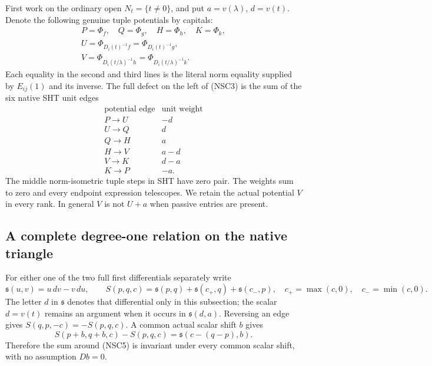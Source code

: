 First work on the ordinary open $N_t=\{t\ne0\}$, and put
$a=v(\lambda)$, $d=v(t)$.  Denote the following genuine tuple
potentials by capitals:
\[
 \begin{gathered}
 P=\Phi_f,\quad Q=\Phi_g,\quad H=\Phi_h,\quad K=\Phi_k,\\
 U=\Phi_{D_i(t)^{-1}f}=\Phi_{D_i(t)^{-1}g},\\
 V=\Phi_{D_i(t/\lambda)^{-1}h}
                     =\Phi_{D_i(t/\lambda)^{-1}k}.
 \end{gathered}
 \tag{NSC4}
\]
Each equality in the second and third lines is the literal
norm equality supplied by $E_{ij}(1)$ and its inverse.
The full defect on the left of (NSC3) is the sum of the
six native SHT unit edges
\[
 \begin{array}{c|c}
 \text{potential edge}&\text{unit weight}\\ \hline
 P\longrightarrow U&-d\\
 U\longrightarrow Q&d\\
 Q\longrightarrow H&a\\
 H\longrightarrow V&a-d\\
 V\longrightarrow K&d-a\\
 K\longrightarrow P&-a .
 \end{array}
 \tag{NSC5}
\]
The middle norm-isometric tuple steps in SHT have zero pair.
The weights sum to zero and every endpoint expression telescopes.
We retain the actual potential $V$ in every rank.  In general
$V$ is not $U+a$ when passive entries are present.

\subsection{A complete degree-one relation on the native triangle}

For either one of the two full first differentials separately
write
\[
  \mathfrak s(u,v)=u\,dv-v\,du,\qquad
  S(p,q,c)=\mathfrak s(p,q)+\mathfrak s(c_+,q)
                                      +\mathfrak s(c_-,p),
  \quad c_+=\max(c,0),\quad c_-=\min(c,0).
 \tag{NSC6}
\]
The letter $d$ in $\mathfrak s$ denotes that differential only
in this subsection; the scalar $d=v(t)$ remains an argument
when it occurs in $\mathfrak s(d,a)$.  Reversing an edge gives
$S(q,p,-c)=-S(p,q,c)$.  A common actual scalar shift $b$ gives
\[
 S(p+b,q+b,c)-S(p,q,c)
               =\mathfrak s(c-(q-p),b).
 \tag{NSC7}
\]
Therefore the sum around (NSC5) is invariant under every
common scalar shift, with no assumption $Db=0$.

